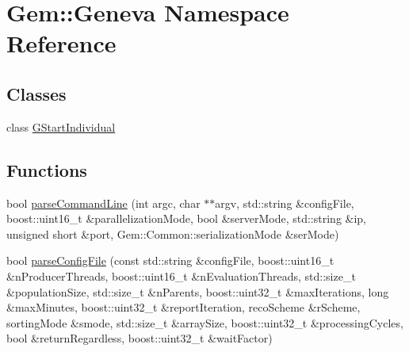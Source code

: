 \hypertarget{namespaceGem_1_1Geneva}{
\section{Gem::Geneva Namespace Reference}
\label{db/de9/namespaceGem_1_1Geneva}
}
\subsection*{Classes}
\begin{DoxyCompactItemize}
\item 
class \hyperlink{classGem_1_1Geneva_1_1GStartIndividual}{GStartIndividual}
\end{DoxyCompactItemize}
\subsection*{Functions}
\begin{DoxyCompactItemize}
\item 
bool \hyperlink{namespaceGem_1_1Geneva_a32eaed60d47903f4584394f0ceb6567c}{parseCommandLine} (int argc, char $\ast$$\ast$argv, std::string \&configFile, boost::uint16\_\-t \&parallelizationMode, bool \&serverMode, std::string \&ip, unsigned short \&port, Gem::Common::serializationMode \&serMode)
\item 
bool \hyperlink{namespaceGem_1_1Geneva_a72bec142348625258508d6cb05700395}{parseConfigFile} (const std::string \&configFile, boost::uint16\_\-t \&nProducerThreads, boost::uint16\_\-t \&nEvaluationThreads, std::size\_\-t \&populationSize, std::size\_\-t \&nParents, boost::uint32\_\-t \&maxIterations, long \&maxMinutes, boost::uint32\_\-t \&reportIteration, recoScheme \&rScheme, sortingMode \&smode, std::size\_\-t \&arraySize, boost::uint32\_\-t \&processingCycles, bool \&returnRegardless, boost::uint32\_\-t \&waitFactor)
\end{DoxyCompactItemize}

